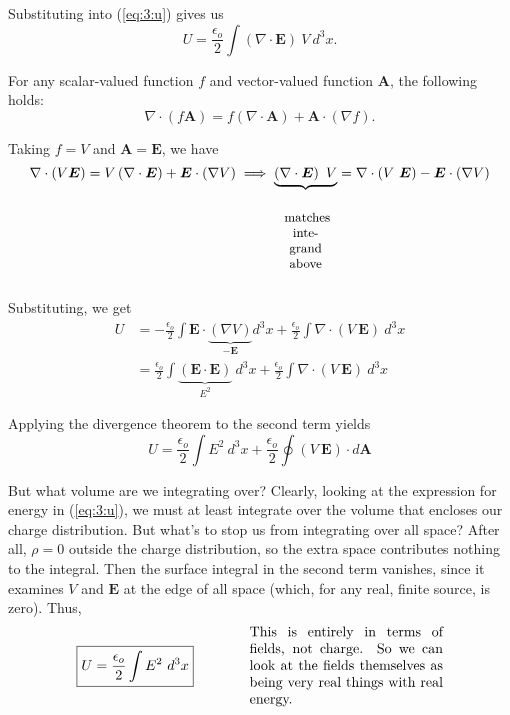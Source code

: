 \documentclass{article}
\numberwithin{equation}{section}
\begin{document}
Substituting into (\ref{eq:3:u}) gives us
\begin{equation*}
    U = \frac{\epsilon_o}{2} \int \left( \nabla \cdot \bm{E} \right)\ V\ d^3x.
\end{equation*}

For any scalar-valued function $f$ and vector-valued function $\bm{A}$, the following holds:
\begin{equation*}
    \nabla \cdot \left( f \bm{A} \right) = f \left( \nabla \cdot \bm{A} \right) + \bm{A} \cdot \left( \nabla f \right).
\end{equation*}

Taking $f = V$ and $\bm{A} = \bm{E}$, we have
\begin{equation*}
    \nabla \cdot \left( V \bm{E} \right) = V \left( \nabla \cdot \bm{E} \right) + \bm{E} \cdot \left( \nabla V \right) \implies \underbrace{\left( \nabla \cdot \bm{E} \right)\ V}_{\parbox[c]{0.088\textwidth}{\begin{center} \small matches integrand above \end{center}}} = \nabla \cdot \left( V\ \bm{E} \right) - \bm{E} \cdot \left( \nabla V \right)
\end{equation*}

Substituting, we get
\begin{align*}
    U &= -\frac{\epsilon_o}{2} \int \bm{E} \cdot \underbrace{\left( \nabla V \right)}_{\displaystyle -\bm{E}} d^3x + \frac{\epsilon_o}{2} \int \nabla \cdot \left( V\ \bm{E} \right)\ d^3x \\
    &= \frac{\epsilon_o}{2} \int \underbrace{\left( \bm{E} \cdot \bm{E} \right)}_{\displaystyle E^2}\ d^3x + \frac{\epsilon_o}{2} \int \nabla \cdot \left( V\ \bm{E} \right)\ d^3x
\end{align*}

Applying the divergence theorem to the second term yields
\begin{equation*}
    U = \frac{\epsilon_o}{2} \int E^2\ d^3x + \frac{\epsilon_o}{2} \oint \left( V\ \bm{E} \right) \cdot d\bm{A}
\end{equation*}

But what volume are we integrating over? Clearly, looking at the expression for energy in (\ref{eq:3:u}), we must at least integrate over the volume that encloses our charge distribution. But what's to stop us from integrating over all space? After all, $\rho = 0$ outside the charge distribution, so the extra space contributes nothing to the integral. Then the surface integral in the second term vanishes, since it examines $V$ and $\bm{E}$ at the edge of all space (which, for any real, finite source, is zero). Thus,
\begin{equation*}
    \boxed{U = \frac{\epsilon_o}{2} \int E^2\ d^3x} \qquad\qquad \parbox[c]{0.4\textwidth}{This is entirely in terms of fields, not charge. So we can look at the fields themselves as being very real things with real energy.}
\end{equation*}
\end{document}
